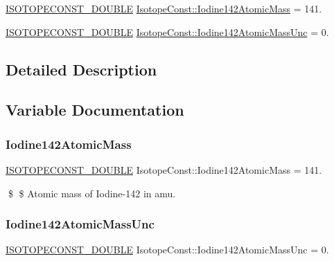 \begin{DoxyCompactItemize}
\item 
\mbox{\hyperlink{group___isotope_const-_macros_ga8f45a7272ce02c0b4c65c44636ed719a}{I\+S\+O\+T\+O\+P\+E\+C\+O\+N\+S\+T\+\_\+\+D\+O\+U\+B\+LE}} \mbox{\hyperlink{group___isotope_const-_iodine-_i142_ga3e3cca3717a2006f89814aa47a083086}{Isotope\+Const\+::\+Iodine142\+Atomic\+Mass}} = 141.
\item 
\mbox{\hyperlink{group___isotope_const-_macros_ga8f45a7272ce02c0b4c65c44636ed719a}{I\+S\+O\+T\+O\+P\+E\+C\+O\+N\+S\+T\+\_\+\+D\+O\+U\+B\+LE}} \mbox{\hyperlink{group___isotope_const-_iodine-_i142_gad5b89985cfb23ac8270eb4fcecde6fa3}{Isotope\+Const\+::\+Iodine142\+Atomic\+Mass\+Unc}} = 0.
\end{DoxyCompactItemize}


\subsection{Detailed Description}


\subsection{Variable Documentation}
\mbox{\label{group___isotope_const-_iodine-_i142_ga3e3cca3717a2006f89814aa47a083086}} 
\subsubsection{\texorpdfstring{Iodine142\+Atomic\+Mass}{Iodine142AtomicMass}}
{\footnotesize\ttfamily \mbox{\hyperlink{group___isotope_const-_macros_ga8f45a7272ce02c0b4c65c44636ed719a}{I\+S\+O\+T\+O\+P\+E\+C\+O\+N\+S\+T\+\_\+\+D\+O\+U\+B\+LE}} Isotope\+Const\+::\+Iodine142\+Atomic\+Mass = 141.}

\$ \$ Atomic mass of Iodine-\/142 in amu. \mbox{\label{group___isotope_const-_iodine-_i142_gad5b89985cfb23ac8270eb4fcecde6fa3}} 
\subsubsection{\texorpdfstring{Iodine142\+Atomic\+Mass\+Unc}{Iodine142AtomicMassUnc}}
{\footnotesize\ttfamily \mbox{\hyperlink{group___isotope_const-_macros_ga8f45a7272ce02c0b4c65c44636ed719a}{I\+S\+O\+T\+O\+P\+E\+C\+O\+N\+S\+T\+\_\+\+D\+O\+U\+B\+LE}} Isotope\+Const\+::\+Iodine142\+Atomic\+Mass\+Unc = 0.}

